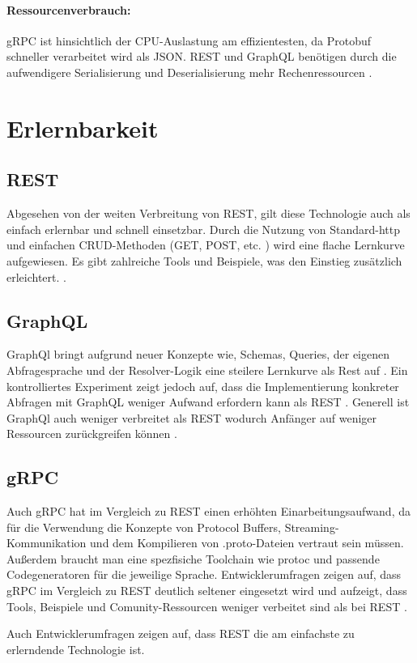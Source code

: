 \paragraph{Ressourcenverbrauch:}  
gRPC ist hinsichtlich der CPU-Auslastung am effizientesten, da Protobuf schneller verarbeitet wird als JSON. REST und GraphQL benötigen durch die aufwendigere Serialisierung und Deserialisierung mehr Rechenressourcen \parencite{Niswar2024PerformanceEvaluation,BergRedi2023Benchmarking}.

\section{Erlernbarkeit}

\subsection{REST}
Abgesehen von der weiten Verbreitung von REST, gilt diese Technologie auch als einfach erlernbar und schnell einsetzbar. Durch die Nutzung von Standard-http und einfachen CRUD-Methoden (GET, POST, etc. ) wird eine flache Lernkurve aufgewiesen. Es gibt zahlreiche Tools und Beispiele, was den Einstieg zusätzlich erleichtert. \parencite{redhat-apiguide,postman2023}.

\subsection{GraphQL}
GraphQl bringt aufgrund neuer Konzepte wie, Schemas, Queries, der eigenen Abfragesprache und der Resolver-Logik eine steilere Lernkurve als Rest auf \parencite{redhat-apiguide}.
Ein kontrolliertes Experiment zeigt jedoch auf, dass die Implementierung konkreter Abfragen mit GraphQL weniger Aufwand erfordern kann als REST \parencite{brito2020graphqlrest}. Generell ist GraphQl auch weniger verbreitet als REST wodurch Anfänger auf weniger Ressourcen zurückgreifen können
 \parencite{postman2023}.

\subsection{gRPC}

Auch gRPC hat im Vergleich zu REST einen erhöhten Einarbeitungsaufwand, da für die Verwendung die Konzepte von Protocol Buffers, Streaming-Kommunikation und dem Kompilieren von .proto-Dateien vertraut sein müssen. Außerdem braucht man eine spezfisiche Toolchain wie protoc und passende Codegeneratoren für die jeweilige Sprache. Entwicklerumfragen  zeigen auf, dass gRPC im Vergleich zu REST deutlich seltener eingesetzt wird und aufzeigt, dass Tools, Beispiele und Comunity-Ressourcen weniger verbeitet sind als bei REST \parencite{redhat-apiguide,gRPCAbout}.

Auch Entwicklerumfragen zeigen auf, dass REST die am einfachste zu erlerndende Technologie ist.


\chapterend